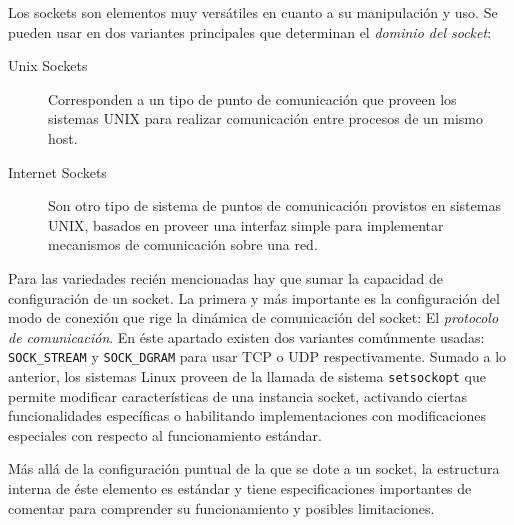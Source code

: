 Los sockets son elementos muy versátiles en cuanto a su manipulación y uso. Se pueden usar en dos variantes principales que determinan el \emph{dominio del socket}:
\begin{description}
\item[Unix Sockets] Corresponden a un tipo de punto de comunicación que proveen los sistemas UNIX para realizar comunicación entre procesos de un mismo host.
\item[Internet Sockets] Son otro tipo de sistema de puntos de comunicación provistos en sistemas UNIX, basados en proveer una interfaz simple para implementar mecanismos de comunicación sobre una red.
\end{description}

Para las variedades recién mencionadas hay que sumar la capacidad de configuración de un socket. La primera y más importante es la configuración del modo de conexión que rige la dinámica de comunicación del socket: El \emph{protocolo de comunicación}. En éste apartado existen dos variantes comúnmente usadas: \verb=SOCK_STREAM= y \verb=SOCK_DGRAM= para usar TCP o UDP respectivamente. Sumado a lo anterior, los sistemas Linux proveen de la llamada de sistema \verb=setsockopt= que permite modificar características de una instancia socket, activando ciertas funcionalidades específicas o habilitando implementaciones con modificaciones especiales con respecto al funcionamiento estándar.

Más allá de la configuración puntual de la que se dote a un socket, la estructura interna de éste elemento es estándar y tiene especificaciones importantes de comentar para comprender su funcionamiento y posibles limitaciones.



